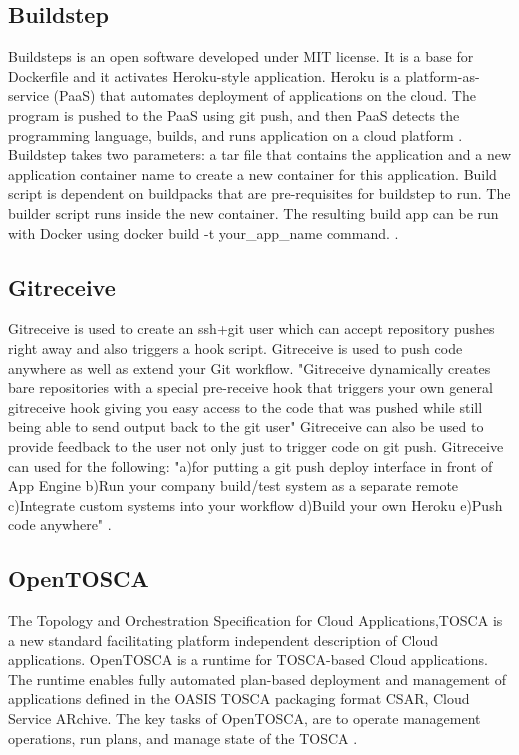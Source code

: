 \subsection{ Buildstep}
     
     Buildsteps is an open software developed under MIT license. 
     It is a base for Dockerfile and it activates Heroku-style 
     application. Heroku is a platform-as-service (PaaS) that 
     automates deployment of applications on the cloud. The 
     program is pushed to the PaaS using git push, and then 
     PaaS detects the programming language, builds, and runs 
     application on a cloud platform \cite{plassnig15}.
     Buildstep takes two parameters: a tar file that contains 
     the application and a new application container name to 
     create a new container for this application. Build script 
     is dependent on buildpacks that are pre-requisites for 
     buildstep to run. The builder script runs inside the new 
     container.  The resulting build app can be run with Docker 
     using docker build -t your\_app\_name command.
     \cite{github-buildstep}. 

\subsection{ Gitreceive}

     Gitreceive is used to create an ssh+git user which can accept
     repository pushes right away and also triggers a hook
     script. Gitreceive is used to push code anywhere as well as
     extend your Git workflow. "Gitreceive dynamically creates bare
     repositories with a special pre-receive hook that triggers your
     own general gitreceive hook giving you easy access to the code
     that was pushed while still being able to send output back to the
     git user" Gitreceive can also be used to provide feedback to the
     user not only just to trigger code on git push.  Gitreceive can
     used for the following: "a)for putting a git push deploy
     interface in front of App Engine b)Run your company build/test
     system as a separate remote c)Integrate custom systems into your
     workflow d)Build your own Heroku e)Push code
     anywhere" \cite{lindsay2016}.
     
\subsection{ OpenTOSCA}

     The Topology and Orchestration Specification for Cloud
     Applications,TOSCA is a new standard facilitating platform
     independent description of Cloud applications. OpenTOSCA is a
     runtime for TOSCA-based Cloud applications. The runtime enables
     fully automated plan-based deployment and management of
     applications defined in the OASIS TOSCA packaging format CSAR,
     Cloud Service ARchive.  The key tasks of OpenTOSCA, are to
     operate management operations, run plans, and manage state of the
     TOSCA \cite{openTOSCA-paper}.
     
